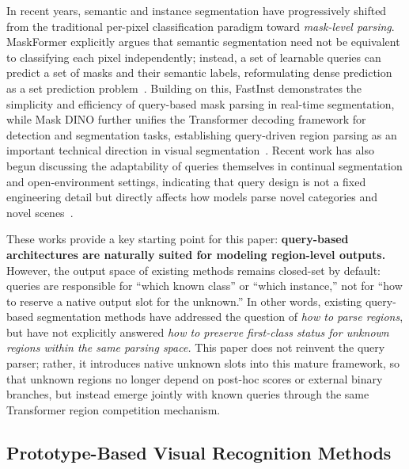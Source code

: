 \documentclass[3p,twocolumn,authoryear]{elsarticle}
\begin{document}
In recent years, semantic and instance segmentation have progressively shifted from
the traditional per-pixel classification paradigm toward \emph{mask-level parsing}.
MaskFormer explicitly argues that semantic segmentation need not be equivalent to
classifying each pixel independently; instead, a set of learnable queries can predict
a set of masks and their semantic labels, reformulating dense prediction as a set
prediction problem~\cite{cheng2021perpixel}.
Building on this, FastInst demonstrates the simplicity and efficiency of query-based
mask parsing in real-time segmentation, while Mask DINO further unifies the Transformer
decoding framework for detection and segmentation tasks, establishing query-driven
region parsing as an important technical direction in visual
segmentation~\cite{he2023fastinstsimple,li2022maskdino}.
Recent work has also begun discussing the adaptability of queries themselves in
continual segmentation and open-environment settings, indicating that query design is
not a fixed engineering detail but directly affects how models parse novel categories
and novel scenes~\cite{zhu2025rethinkingquery}.

These works provide a key starting point for this paper:
\textbf{query-based architectures are naturally suited for modeling region-level outputs.}
However, the output space of existing methods remains closed-set by default:
queries are responsible for ``which known class'' or ``which instance,''
not for ``how to reserve a native output slot for the unknown.''
In other words, existing query-based segmentation methods have addressed the question
of \emph{how to parse regions}, but have not explicitly answered \emph{how to preserve
first-class status for unknown regions within the same parsing space.}
This paper does not reinvent the query parser; rather, it introduces native unknown
slots into this mature framework, so that unknown regions no longer depend on
post-hoc scores or external binary branches, but instead emerge jointly with known
queries through the same Transformer region competition mechanism.

\subsection{Prototype-Based Visual Recognition Methods}
\label{sec:rw-proto}
\end{document}
